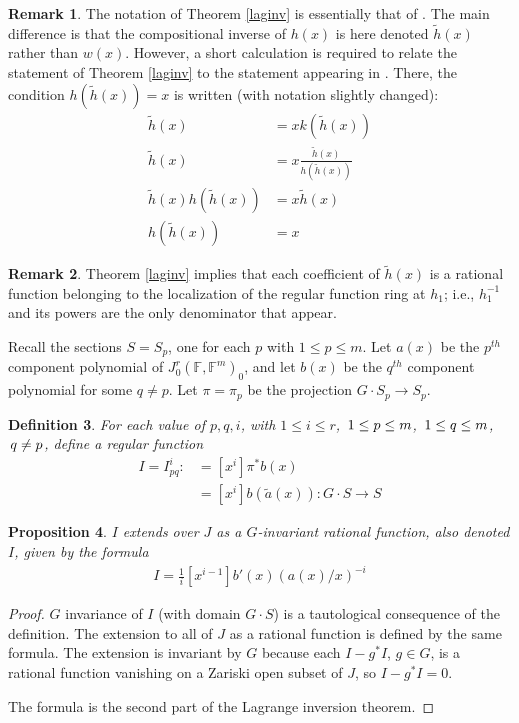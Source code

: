 \documentclass[12pt]{article}
\numberwithin{equation}{section}
\theoremstyle{plain}
\newtheorem{definition}{Definition}[section]
\newtheorem{proposition}[definition]{Proposition}
\theoremstyle{definition}
\newtheorem{remark}[definition]{Remark}
\newcommand{\ra}{\rightarrow}
\newcommand{\Fb}{\mathbb{F}}
\begin{document}
\begin{remark} The notation of Theorem \ref{laginv} is essentially that of \cite{richmond98}. The main difference is that the compositional inverse of $h(x)$ is here denoted $\widetilde{h}(x)$ rather than $w(x)$. However, a short calculation is required to relate the statement of Theorem \ref{laginv} to the statement appearing in \cite{richmond98}. There, the condition $h(\widetilde{h}(x))=x$ is written (with notation slightly changed):
\begin{align*}
\widetilde{h}(x)&=xk(\widetilde{h}(x))\\
\widetilde{h}(x)&=x\frac{\widetilde{h}(x)}{h(\widetilde{h}(x))}\\
\widetilde{h}(x)h(\widetilde{h}(x))&=x\widetilde{h}(x)\\
h(\widetilde{h}(x)) &= x
\end{align*}
\end{remark}

\begin{remark}\label{only1inv} Theorem \ref{laginv} implies that each coefficient of $\widetilde{h}(x)$ is a rational function belonging to the localization of the regular function ring at $h_1$; i.e., $h_1^{-1}$ and its powers are the only denominator that appear.
\end{remark}

Recall the sections $S=S_p$, one for each $p$ with $1\leq p\leq m$. Let $a(x)$ be the $p^{th}$ component polynomial of $J^{r}_0(\Fb,\Fb^{m})_0$, and let $b(x)$ be the $q^{th}$ component polynomial for some $q\neq p$. Let $\pi=\pi_p$ be the projection $G\cdot S_p\ra S_p$.

\begin{definition} For each value of $p,q,i$, with $1\leq i\leq r$, $\thinspace 1\leq p\leq m$, $\thinspace 1\leq q\leq m$, $\thinspace q\neq p$, define a regular function
\begin{align*}
I=I_{pq}^i:&=[x^{i}]\pi^{*}b(x)\\
          &=[x^{i}]b(\widetilde{a}(x)): G\cdot S \ra S
\end{align*}
\end{definition}
\begin{proposition} $I$ extends over $J$ as a $G$-invariant rational function, also denoted $I$, given by the formula
\begin{align*}
I=\tfrac{1}{i}[x^{i-1}]b'(x)(a(x)/x)^{-i}
\end{align*}
\end{proposition}
\begin{proof}
$G$ invariance of $I$ (with domain $G\cdot S$) is a tautological consequence of the definition. The extension to all of $J$ as a rational function is defined by the same formula. The extension is invariant by $G$ because each $I-g^{*}I$, $g\in G$, is a rational function vanishing on a Zariski open subset of $J$, so $I-g^{*}I=0$.

The formula is the second part of the Lagrange inversion theorem.
\end{proof}
\end{document}
